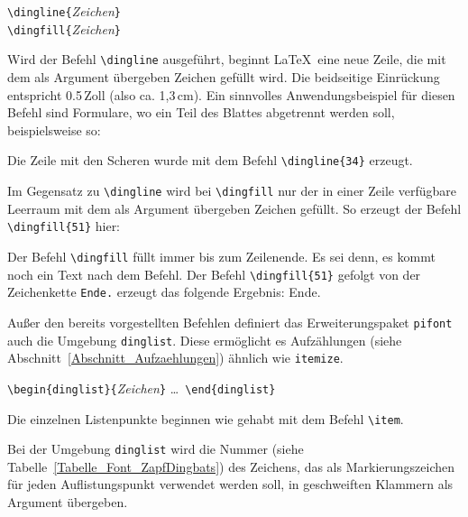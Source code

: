 \documentclass[a4paper,10pt,twoside]{scrbook}
\begin{document}
\begin{boxedminipage}{\textwidth}
\texttt{\textbackslash dingline\{}\textsl{Zeichen}\texttt{\}} \\
\texttt{\textbackslash dingfill\{}\textsl{Zeichen}\texttt{\}} 
\end{boxedminipage}


Wird der Befehl \verb!\dingline! ausgeführt, beginnt \LaTeX\ eine neue Zeile, die mit dem als Argument übergeben  
Zeichen gefüllt wird. Die beidseitige Einrückung
entspricht 0.5\,Zoll (also ca. 1,3\,cm). Ein sinnvolles Anwendungsbeispiel für diesen Befehl sind Formulare, wo ein Teil des Blattes 
abgetrennt werden soll, beispielsweise so: 


Die Zeile mit den Scheren wurde mit dem Befehl \verb!\dingline{34}! erzeugt.

Im Gegensatz zu \verb!\dingline! wird bei \verb!\dingfill! nur der 
in einer Zeile verfügbare Leerraum mit dem als Argument übergeben  
Zeichen gefüllt. So erzeugt der Befehl \verb!\dingfill{51}! hier: 

Der Befehl \verb!\dingfill! füllt immer bis zum Zeilenende.
Es sei denn, es kommt noch ein Text nach dem Befehl. 
Der Befehl \verb!\dingfill{51}! gefolgt von der Zeichenkette \verb!Ende.! erzeugt das folgende Ergebnis:  Ende. 

Außer den bereits vorgestellten Befehlen definiert das Erweiterungspaket \verb!pifont! auch die Umgebung
\verb!dinglist!. Diese ermöglicht es Aufzählungen (siehe Abschnitt~\ref{Abschnitt_Aufzaehlungen})
ähnlich wie \verb!itemize!. 


\begin{boxedminipage}{\textwidth}
\texttt{\textbackslash begin\{dinglist\}\{}\textsl{Zeichen}\texttt{\}}  \enskip \dots\ \enskip \texttt{\textbackslash end\{dinglist\}} 
\end{boxedminipage}

Die einzelnen Listenpunkte beginnen wie gehabt mit dem Befehl \verb!\item!.

Bei der Umgebung \verb!dinglist! wird die Nummer (siehe Tabelle~\ref{Tabelle_Font_ZapfDingbats}) des Zeichens, das als Markierungszeichen für jeden Auflistungspunkt verwendet werden soll, in geschweiften Klammern als Argument übergeben.
\end{document}
